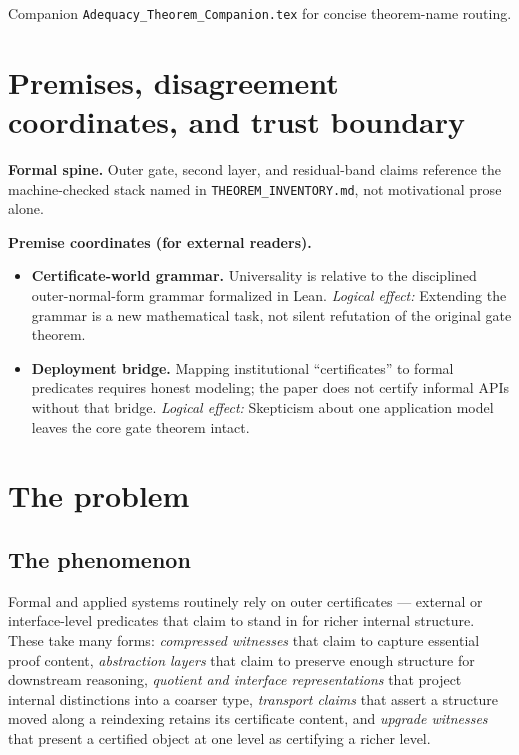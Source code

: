 \documentclass[11pt]{article}
\theoremstyle{plain}
\theoremstyle{definition}
\theoremstyle{remark}
\begin{document}
\noindent Companion \texttt{Adequacy\_Theorem\_Companion.tex} for concise theorem-name routing.

\section{Premises, disagreement coordinates, and trust boundary}\label{sec:premises-adequacy-flagship}
\begin{keybox}[title=Where disagreement can (and cannot) live]
\textbf{Formal spine.}
Outer gate, second layer, and residual-band claims reference the machine-checked stack named in \texttt{THEOREM\_INVENTORY.md}, not motivational prose alone.

\medskip
\textbf{Premise coordinates (for external readers).}
\begin{itemize}[leftmargin=2em]
\item \textbf{Certificate-world grammar.} Universality is relative to the disciplined outer-normal-form grammar formalized in Lean.
  \emph{Logical effect:} Extending the grammar is a new mathematical task, not silent refutation of the original gate theorem.
\item \textbf{Deployment bridge.} Mapping institutional ``certificates'' to formal predicates requires honest modeling; the paper does not certify informal APIs without that bridge.
  \emph{Logical effect:} Skepticism about one application model leaves the core gate theorem intact.
\end{itemize}
\end{keybox}

\tableofcontents

\section{The problem}
\label{sec:problem}

\subsection{The phenomenon}

Formal and applied systems routinely rely on outer certificates --- external
or interface-level predicates that claim to stand in for richer internal
structure.  These take many forms: \emph{compressed witnesses} that claim
to capture essential proof content, \emph{abstraction layers} that claim
to preserve enough structure for downstream reasoning, \emph{quotient and
interface representations} that project internal distinctions into a coarser
type, \emph{transport claims} that assert a structure moved along a
reindexing retains its certificate content, and \emph{upgrade witnesses}
that present a certified object at one level as certifying a richer level.
\end{document}
